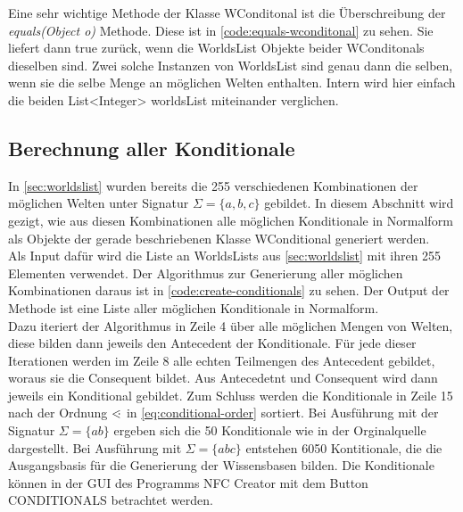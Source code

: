 \documentclass[12pt,a4paper]{article}
\newcommand\dotl{\mathrel{%
    \mathchoice{\QEQ}{\QEQ}{\QEQ}{\QEQ}%
}}
\def\QEQ{{%
    \setbox0\hbox{<}%
    \rlap{\hbox to \wd0{\hss \raisebox {0.1pt}{$\ \cdot$\hss}}}\box0
}}
\begin{document}
Eine sehr wichtige Methode der Klasse WConditonal ist die Überschreibung der \textit{equals(Object o)} Methode. Diese ist in \autoref{code:equals-wconditonal} zu sehen. Sie liefert dann true zurück, wenn die WorldsList Objekte beider WConditonals dieselben sind. Zwei solche Instanzen von WorldsList sind genau dann die selben, wenn sie die selbe Menge an möglichen Welten enthalten. Intern wird hier einfach die beiden List<Integer> worldsList miteinander verglichen.



\subsection{Berechnung aller Konditionale}




In \autoref{sec:worldslist} wurden bereits die 255 verschiedenen Kombinationen der möglichen Welten unter Signatur $\Sigma=\{a,b,c\}$ gebildet. In diesem Abschnitt wird gezigt, wie aus diesen Kombinationen alle möglichen Konditionale in Normalform als Objekte der gerade beschriebenen Klasse WConditional generiert werden. \\
Als Input dafür wird die Liste an WorldsLists aus \autoref{sec:worldslist} mit ihren 255 Elementen verwendet. Der Algorithmus zur Generierung aller möglichen Kombinationen daraus ist in \autoref{code:create-conditionals} zu sehen. Der Output der Methode ist eine Liste aller möglichen Konditionale in Normalform. \\
Dazu iteriert der Algorithmus in Zeile 4 über alle möglichen Mengen von Welten, diese bilden dann jeweils den Antecedent der Konditionale. Für jede dieser Iterationen werden im Zeile 8 alle echten Teilmengen des Antecedent gebildet, woraus sie die Consequent bildet. Aus Antecedetnt und Consequent wird dann jeweils ein Konditional gebildet. Zum Schluss werden die Konditionale in Zeile 15 nach der Ordnung $\dotl$ in \autoref{eq:conditional-order} sortiert. Bei Ausführung mit der Signatur $\Sigma=\{ab\}$ ergeben sich die 50 Konditionale wie in der Orginalquelle \cite{beierle19} dargestellt. Bei Ausführung mit $\Sigma=\{abc\}$ entstehen 6050 Kontitionale, die die Ausgangsbasis für die Generierung der Wissensbasen bilden. Die Konditionale können in der GUI des Programms NFC Creator mit dem Button CONDITIONALS betrachtet werden.
\end{document}
